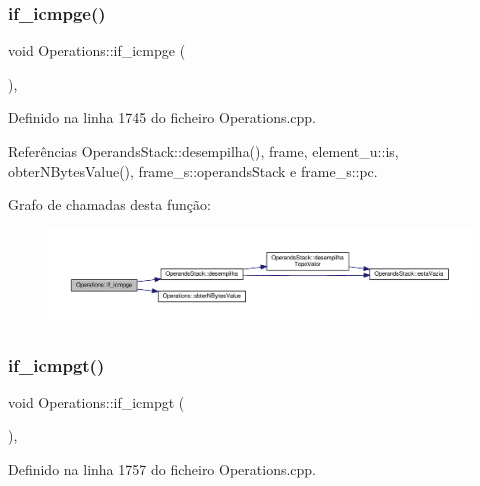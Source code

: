 \subsubsection{\texorpdfstring{if\+\_\+icmpge()}{if\_icmpge()}}
{\footnotesize\ttfamily void Operations\+::if\+\_\+icmpge (\begin{DoxyParamCaption}{ }\end{DoxyParamCaption})\hspace{0.3cm}{\ttfamily [static]}, {\ttfamily [private]}}



Definido na linha 1745 do ficheiro Operations.\+cpp.



Referências Operands\+Stack\+::desempilha(), frame, element\+\_\+u\+::is, obter\+N\+Bytes\+Value(), frame\+\_\+s\+::operands\+Stack e frame\+\_\+s\+::pc.

Grafo de chamadas desta função\+:
\nopagebreak
\begin{figure}[H]
\begin{center}
\leavevmode
\includegraphics[width=350pt]{classOperations_a147f088fabd19030a535ac68ff091be1_cgraph}
\end{center}
\end{figure}
\mbox{\label{classOperations_a40232532d2522ef0afe261555688a7fd}} 
\subsubsection{\texorpdfstring{if\+\_\+icmpgt()}{if\_icmpgt()}}
{\footnotesize\ttfamily void Operations\+::if\+\_\+icmpgt (\begin{DoxyParamCaption}{ }\end{DoxyParamCaption})\hspace{0.3cm}{\ttfamily [static]}, {\ttfamily [private]}}



Definido na linha 1757 do ficheiro Operations.\+cpp.



